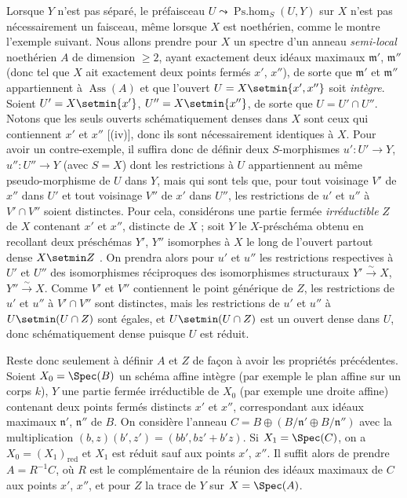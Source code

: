 \begin{remark}[20.2.16]
\label{IV.20.2.16}
Lorsque $Y$ n'est pas séparé, le préfaisceau $U\leadsto\operatorname{Ps.hom}_S(U,Y)$ sur $X$ n'est pas nécessairement un faisceau, même lorsque $X$ est noethérien, comme le montre l'exemple suivant.
Nous allons prendre pour $X$ un spectre d'un anneau \emph{semi-local} noethérien $A$ de dimension $\geq2$, ayant exactement deux idéaux
maximaux $\mathfrak{m}'$, $\mathfrak{m}''$ (donc tel que $X$ ait exactement deux points fermés $x'$, $x''$), de sorte que $\mathfrak{m}'$ et $\mathfrak{m}''$ appartiennent à $\operatorname{Ass}(A)$ et que l'ouvert $U=X\setmin\{x',x''\}$ soit \emph{intègre}.
Soient $U'=X\setmin\{x'\}$, $U''=X\setmin\{x''\}$, de sorte que $U=U'\cap U''$.
Notons que les seuls ouverts schématiquement denses dans $X$ sont ceux qui contiennent $x'$ et $x''$ [(iv)], donc ils sont nécessairement identiques à $X$.
Pour avoir un contre-exemple, il suffira donc de définir deux $S$-morphismes $u':U'\to Y$, $u'':U''\to Y$ (avec $S=X$) dont les restrictions à $U$ appartiennent au même pseudo-morphisme de $U$ dans $Y$, mais qui sont tels que, pour tout voisinage $V'$ de $x''$ dans $U'$ et tout voisinage $V''$ de $x'$ dans $U''$, les restrictions de $u'$ et $u''$ à $V'\cap V''$ soient distinctes.
Pour cela, considérons une partie fermée \emph{irréductible} $Z$ de $X$ contenant $x'$ et $x''$, distincte de $X$ ; soit $Y$ le $X$-préschéma obtenu en recollant deux préschémas $Y'$, $Y''$ isomorphes à $X$ le long de l'ouvert partout dense $X\setmin Z$ .
On prendra alors pour $u'$ et $u''$ les restrictions respectives à $U'$ et $U''$ des isomorphismes réciproques des isomorphismes structuraux $Y'\xrightarrow{\sim}X$, $Y''\xrightarrow{\sim}X$.
Comme $V'$ et $V''$ contiennent le point générique de $Z$, les restrictions de $u'$ et $u''$ à $V'\cap V''$ sont distinctes, mais les restrictions de $u'$ et $u''$ à $U\setmin(U\cap Z)$ sont égales, et $U\setmin(U\cap Z)$ est un ouvert dense dans $U$, donc schématiquement dense puisque $U$ est réduit.

Reste donc seulement à définir $A$ et $Z$ de façon à avoir les propriétés précédentes.
Soient $X_0=\Spec(B)$ un schéma affine intègre (par exemple le plan affine sur un corps $k$), $Y$ une partie fermée irréductible de $X_0$ (par exemple une droite affine) contenant deux points fermés distincts $x'$ et $x''$, correspondant aux idéaux maximaux $\mathfrak{n}'$, $\mathfrak{n}''$ de $B$.
On considère l'anneau $C=B\oplus(B/\mathfrak{n}'\oplus B/\mathfrak{n}'')$ avec la multiplication $(b,z)(b',z')=(bb',bz'+b'z)$.
Si $X_1=\Spec(C)$, on a $X_0=(X_1)_\mathrm{red}$ et $X_1$ est réduit sauf aux points $x'$, $x''$.
Il suffit alors de prendre $A=R^{-1}C$, où $R$ est le complémentaire de la réunion des idéaux maximaux de $C$ aux points $x'$, $x''$, et pour $Z$ la trace de $Y$ sur $X=\Spec(A)$.
\end{remark}

